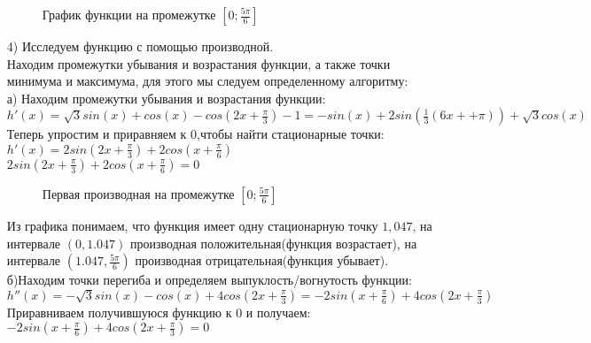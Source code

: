 \documentclass[russian,utf8,nocolumnxxxi,nocolumnxxxii]{eskdtext}
\begin{document}
\begin{enumerate}
    \begin{figure}[h]
    \centering
        \caption{График функции на промежутке $[0;\frac{5\pi}{6}]$}
    \end{figure}
    
    \item[4)]Исследуем функцию с помощью производной.\\
    Находим промежутки убывания и возрастания функции, а также точки минимума и максимума, для этого мы следуем определенному алгоритму:\\
    а) Находим промежутки убывания и возрастания функции:\\
    $h'(x)=\sqrt{3}sin(x)+cos(x)-cos(2x+\frac{\pi}{3})-1=-sin(x)+2sin(\frac{1}{3}(6x++\pi))+\sqrt{3}cos(x)$\\
    Теперь упростим и приравняем к 0,чтобы найти стационарные точки:\\
    $h'(x)=2sin(2x+\frac{\pi}{3})+2cos(x+\frac{\pi}{6})$\\
    $2sin(2x+\frac{\pi}{3})+2cos(x+\frac{\pi}{6})=0$\\
    \begin{figure}[h]
    \centering
    \caption{Первая производная на промежутке $[0;\frac{5\pi}{6}]$}
    \end{figure}
    Из графика понимаем, что функция имеет одну стационарную точку $1,047$, на интервале $(0,1.047)$ производная положительная(функция возрастает), на интервале $(1.047,\frac{5\pi}{6})$ производная отрицательная(функция убывает).\\
    б)Находим точки перегиба и определяем выпуклость/вогнутость функции:\\
    $h''(x)=-\sqrt{3}sin(x)-cos(x)+4cos(2x+\frac{\pi}{3})=-2sin(x+\frac{\pi}{6})+4cos(2x+\frac{\pi}{3})$\\
    Приравниваем получившуюся функцию к 0 и получаем:\\
    $-2sin(x+\frac{\pi}{6})+4cos(2x+\frac{\pi}{3})=0$\\
    

\end{enumerate}
\end{document}
